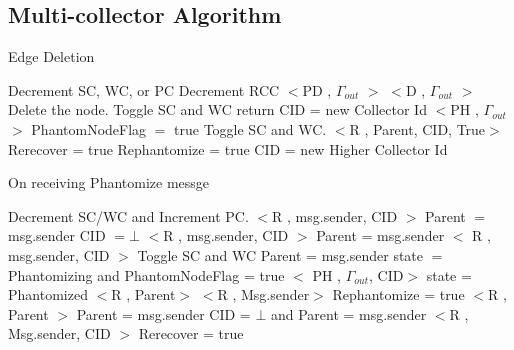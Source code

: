 \subsection{Multi-collector Algorithm}
\label{multialgo}
\begin{algorithm}[H]
\caption{Edge Deletion}
\label{Link Deletion}
\scriptsize
\begin{algorithmic}[1]
\State Decrement SC, WC, or PC
    \State Decrement RCC
  \EndIf
			\State $<$PD , $\Gamma_{out}$ $>$
			\State $<$D , $\Gamma_{out}$ $>$
			\State Delete the node.
		\EndIf
		\State Toggle SC and WC
      \State return
    \EndIf
		\State CID = new Collector Id
		\State $<$PH , $\Gamma_{out}$ $>$
		\State PhantomNodeFlag $=$ true
		\State Toggle SC and WC.
				\State $<$R , Parent, CID, True$>$
		\EndIf
			\State Rerecover = true
			\State Rephantomize = true
		\EndIf
	  \State CID = new Higher Collector Id
	\EndIf
\EndProcedure
\end{algorithmic}
\end{algorithm}	

	
\begin{algorithm}[H]
\caption{On receiving Phantomize messge}
\label{Phantom message received}
\scriptsize
\begin{algorithmic}[1]
\State Decrement SC/WC and Increment PC.
			\State $<$R , msg.sender, CID $>$
		\Else
			\State Parent $=$ msg.sender
			\State CID $= \bot$ 
		\EndIf
	\Else
		\State $<$R , msg.sender, CID $>$
	\EndIf
{}
	\State Parent = msg.sender
	\State $<$ R , msg.sender, CID $>$
	\State Toggle SC and WC
	\State Parent = msg.sender
	\State state $=$ Phantomizing and PhantomNodeFlag = true
	\State $<$ PH , $\Gamma_{out}$, CID$>$
		\State state = Phantomized
		\State $<$R , Parent$>$
	\EndIf
{}
		\State $<$R , Msg.sender$>$
	\Else
  	\State Rephantomize = true
			\State $<$R , Parent $>$
			\State Parent = msg.sender
		\Else
				\State CID = $\bot$ and Parent = msg.sender
			\Else
				\State $<$R , Msg.sender, CID $>$
				\State Rerecover = true
			\EndIf
		\EndIf
	\EndIf
\EndIf
\EndProcedure
\end{algorithmic}
\end{algorithm}	
	

